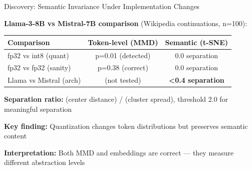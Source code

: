 \documentclass[aspectratio=169,11pt]{beamer}
\begin{document}
\begin{frame}{Discovery: Semantic Invariance Under Implementation Changes}

\textbf{Llama-3-8B vs Mistral-7B comparison} (Wikipedia continuations, n=100):

\vspace{0.5em}

\begin{center}
\begin{tabular}{lcc}
\toprule
\textbf{Comparison} & \textbf{Token-level (MMD)} & \textbf{Semantic (t-SNE)} \\
\midrule
fp32 vs int8 (quant) & p=0.01 (detected) & 0.0 separation \\
fp32 vs fp32 (sanity) & p=0.38 (correct) & 0.0 separation \\
Llama vs Mistral (arch) & (not tested) & \textbf{<0.4 separation} \\
\bottomrule
\end{tabular}
\end{center}

\vspace{0.5em}

\textbf{Separation ratio:} (center distance) / (cluster spread), threshold 2.0 for meaningful separation

\vspace{1em}

\textbf{Key finding:} Quantization changes token distributions but preserves semantic content

\textbf{Interpretation:} Both MMD and embeddings are correct — they measure different abstraction levels

\end{frame}
\end{document}

